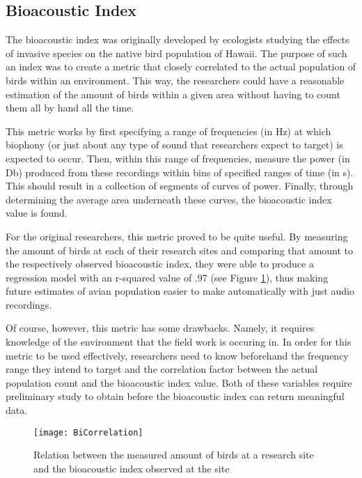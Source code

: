 \subsection{Bioacoustic Index}
The bioacoustic index was originally developed by ecologists studying the effects of invasive species on the native bird population of Hawaii. The purpose of such an index was to create a metric that closely correlated to the actual population of birds within an environment. This way, the researchers could have a reasonable estimation of the amount of birds within a given area without having to count them all by hand all the time.\par
This metric works by first specifying a range of frequencies (in Hz) at which biophony (or just about any type of sound that researchers expect to target) is expected to occur. Then, within this range of frequencies, measure the power (in Db) produced from these recordings within bins of specified ranges of time (in s). This should result in a collection of segments of curves of power. Finally, through determining the average area underneath these curves, the bioacoustic index value is found.\par
For the original researchers, this metric proved to be quite useful. By measuring the amount of birds at each of their research sites and comparing that amount to the respectively observed bioacoustic index, they were able to produce a regression model with an r-squared value of .97 (see Figure \ref{fig:BiCorrelation}), thus making future estimates of avian population easier to make automatically with just audio recordings.\cite{boelman}\par
Of course, however, this metric has some drawbacks. Namely, it requires knowledge of the environment that the field work is occuring in. In order for this metric to be used effectively, researchers need to know beforehand the frequency range they intend to target and the correlation factor between the actual population count and the bioacoustic index value. Both of these variables require preliminary study to obtain before the bioacoustic index can return meaningful data.\par
\begin{figure}
  \begin{center}
    \texttt{[image: BiCorrelation]}
  \end{center}
  \caption{Relation between the measured amount of birds at a research site and the bioacoustic index observed at the site}
  \label{fig:BiCorrelation}
\end{figure}
